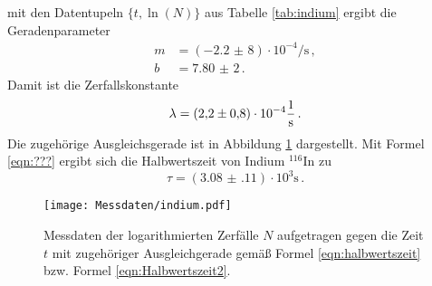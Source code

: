 mit den Datentupeln $\{ t, \ln (N)\}$ aus Tabelle \ref{tab:indium} ergibt die Geradenparameter
\begin{align*}
	m &= (-\num{2,2(8)}) \cdot 10^{-4} \si{\per\second}  \, \mathrm{,} \\
	b &= \num{7,80(2)} \, \mathrm{.}
\end{align*}
Damit ist die Zerfallskonstante
\begin{equation*}
	\lambda = (\num{2,2(8)}) \cdot 10^{-4} \si{\per\second}  \, \mathrm{.} \\
\end{equation*}
Die zugehörige Ausgleichsgerade ist in Abbildung \ref{fig:indium} dargestellt.
Mit Formel \eqref{eqn:???} ergibt sich die Halbwertszeit von Indium $^{116}\mathrm{In}$
zu
\begin{equation*}
	\tau =  (\num{3.08(11)}) \cdot 10^3 \si{\second} \, \mathrm{.}
\end{equation*}
\begin{figure}
	\centering
	\texttt{[image: Messdaten/indium.pdf]}
	\caption{Messdaten der logarithmierten Zerfälle $N$ aufgetragen gegen die Zeit $t$ mit zugehöriger Ausgleichgerade gemäß Formel \eqref{eqn:halbwertszeit} bzw. Formel \eqref{eqn:Halbwertszeit2}.}
	\label{fig:indium}
\end{figure}






